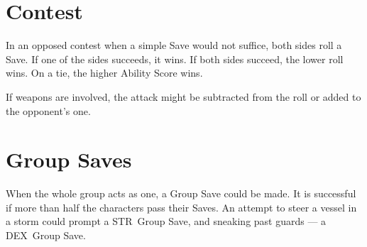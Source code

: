 \documentclass[itdr/core]{subfiles}
\begin{document}
\section{Contest}
In an opposed contest when a simple Save would not suffice, both sides roll a Save. If one of the sides succeeds, it wins. If both sides succeed, the lower roll wins. On a tie, the higher Ability Score wins.

If weapons are involved, the attack might be subtracted from the roll or added to the opponent's one.

\vfill

\section{Group Saves}
When the whole group acts as one, a Group Save could be made. It is successful if more than half the characters pass their Saves. An attempt to steer a vessel in a storm could prompt a STR~Group Save, and sneaking past guards --- a DEX~Group Save.

\vfill

\begin{comment}
\section{Gods, Religion, and Disciples}
\index{Religion}
\index{Disciple}
\index{Creed}

The nature of divine presence is highly dependent on a specific setting and thus is left to your discretion. Some worlds could be completely devoid of divine influence (though local cults might still have supernatural powers from some other source), while dwellers of other worlds can regularly observe their gods' interventions in the deals of mortals.

\subparagraph{Disciple} Class and its Creeds from the \textbf{\customref{ch:appendix_c}{Appendix C: Class-ic Edition}} could be used as a Feature to represent the most devoted adepts of cryptic cults. Unlike other Features, this one has a prerequisite of the character being a worshipper of the relevant set of teachings. When obtaining a new Experience Level, follow standard rules. Additionally, from Expert onwards, Disciples gain d4 (up to their WIL~/~2, rounded down) Followers (3hp, Simple Weapon) each time they visit a friendly settlement and are responsible for their food, shelter, equipment, etc.
\end{comment}
\end{document}
